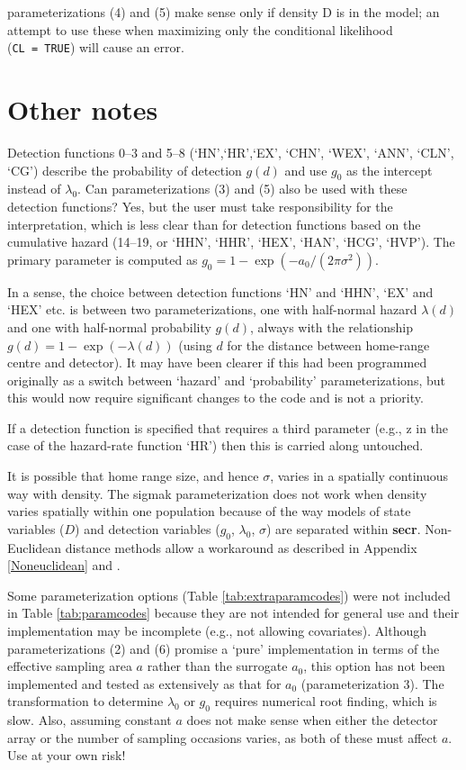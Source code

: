 \documentclass[
]{book}
\begin{document}
parameterizations (4) and (5) make sense only if density D is in the model; an attempt to use these when maximizing only the conditional likelihood (\texttt{CL\ =\ TRUE}) will cause an error.

\section{Other notes}\label{other-notes}

Detection functions 0--3 and 5--8 (`HN',`HR',`EX', `CHN', `WEX', `ANN', `CLN', `CG') describe the probability of detection \(g(d)\) and use \(g_0\) as the intercept instead of \(\lambda_0\). Can parameterizations (3) and (5) also be used with these detection functions? Yes, but the user must take responsibility for the interpretation, which is less
clear than for detection functions based on the cumulative hazard (14--19, or `HHN', `HHR', `HEX', `HAN', `HCG', `HVP'). The primary parameter is computed as \(g_0 = 1 - \exp(-a_0 / (2\pi \sigma^2))\).

In a sense, the choice between detection functions `HN' and `HHN', `EX' and `HEX' etc. is between two parameterizations, one with half-normal hazard \(\lambda(d)\) and one with half-normal probability \(g(d)\), always with the relationship \(g(d) = 1 - \exp(-\lambda(d))\) (using \(d\) for the distance between home-range centre and detector). It may have been clearer if this had been programmed originally as a switch between `hazard' and `probability' parameterizations, but this would now require significant changes to the code and is not a priority.

If a detection function is specified that requires a third parameter (e.g., z in the case of the hazard-rate function `HR') then this is carried along untouched.

It is possible that home range size, and hence \(\sigma\), varies in a spatially continuous way with density. The sigmak parameterization does not work when density varies spatially within one population because of the way models of state variables (\(D\)) and detection variables (\(g_0\), \(\lambda_0\), \(\sigma\)) are separated within \textbf{secr}. Non-Euclidean distance methods allow a workaround as described in Appendix \ref{Noneuclidean} and \citet{edjq16}.

Some parameterization options (Table \ref{tab:extraparamcodes}) were not included in Table \ref{tab:paramcodes} because they are not intended for general use and their implementation may be incomplete (e.g., not allowing covariates). Although parameterizations (2) and (6) promise a `pure' implementation in terms of the effective sampling area \(a\) rather than the surrogate \(a_0\), this option has not been implemented and tested as extensively as that for \(a_0\) (parameterization 3). The transformation to determine \(\lambda_0\) or \(g_0\) requires numerical root finding, which is slow. Also, assuming constant \(a\) does not make sense when either the detector array or the number of sampling occasions varies, as both of these must affect \(a\). Use at your own risk!
\end{document}
